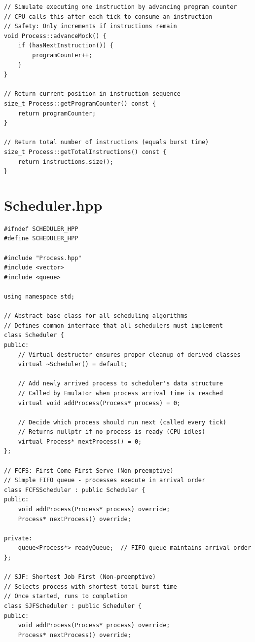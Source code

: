 \documentclass[a4paper,10pt,oneside]{article}
\begin{document}
\begin{multicols*}{\COLS}
\begin{lstlisting}
// Simulate executing one instruction by advancing program counter
// CPU calls this after each tick to consume an instruction
// Safety: Only increments if instructions remain
void Process::advanceMock() {
    if (hasNextInstruction()) {
        programCounter++;
    }
}

// Return current position in instruction sequence
size_t Process::getProgramCounter() const {
    return programCounter;
}

// Return total number of instructions (equals burst time)
size_t Process::getTotalInstructions() const {
    return instructions.size();
}
\end{lstlisting}

\section*{Scheduler.hpp}
\begin{lstlisting}
#ifndef SCHEDULER_HPP
#define SCHEDULER_HPP

#include "Process.hpp"
#include <vector>
#include <queue>

using namespace std;

// Abstract base class for all scheduling algorithms
// Defines common interface that all schedulers must implement
class Scheduler {
public:
    // Virtual destructor ensures proper cleanup of derived classes
    virtual ~Scheduler() = default;

    // Add newly arrived process to scheduler's data structure
    // Called by Emulator when process arrival time is reached
    virtual void addProcess(Process* process) = 0;

    // Decide which process should run next (called every tick)
    // Returns nullptr if no process is ready (CPU idles)
    virtual Process* nextProcess() = 0;
};

// FCFS: First Come First Serve (Non-preemptive)
// Simple FIFO queue - processes execute in arrival order
class FCFSScheduler : public Scheduler {
public:
    void addProcess(Process* process) override;
    Process* nextProcess() override;

private:
    queue<Process*> readyQueue;  // FIFO queue maintains arrival order
};

// SJF: Shortest Job First (Non-preemptive)
// Selects process with shortest total burst time
// Once started, runs to completion
class SJFScheduler : public Scheduler {
public:
    void addProcess(Process* process) override;
    Process* nextProcess() override;


\end{lstlisting}
\end{multicols*}
\end{document}
